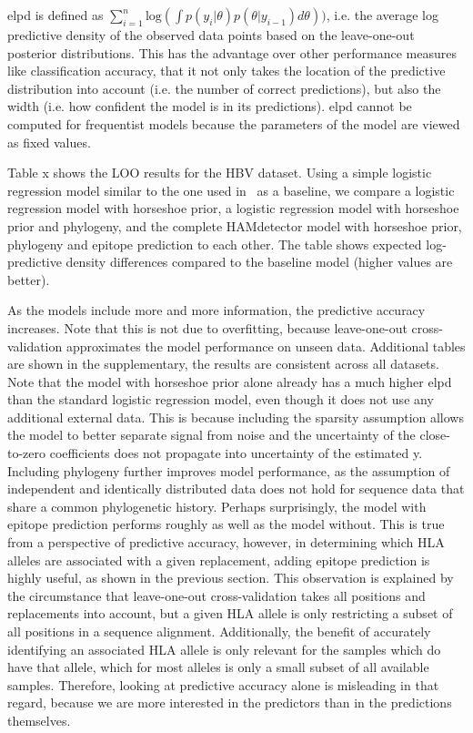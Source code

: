 \documentclass[fleqn,11pt]{SelfArx} %
\begin{document}
elpd is defined as \(\sum_{i=1}^{n}\text{log}(\int p(y_i|\theta)p(\theta|y_{i-1})d\theta))\), i.e. the average log predictive density of the observed data points based on the leave-one-out posterior distributions.
This has the advantage over other performance measures like classification accuracy, that it not only takes the location of the predictive distribution into account (i.e. the number of correct predictions), but also the width (i.e. how confident the model is in its predictions).
elpd cannot be computed for frequentist models because the parameters of the model are viewed as fixed values.

Table x shows the LOO results for the HBV dataset.
Using a simple logistic regression model similar to the one used in~\cite{Moore2002} as a baseline, we compare a logistic regression model with horseshoe prior, a logistic regression model with horseshoe prior and phylogeny, and the complete HAMdetector model with horseshoe prior, phylogeny and epitope prediction to each other.
The table shows expected log-predictive density differences compared to the baseline model (higher values are better).

As the models include more and more information, the predictive accuracy increases. Note that this is not due to overfitting, because leave-one-out cross-validation approximates the model performance on unseen data. Additional tables are shown in the supplementary, the results are consistent across all datasets.
Note that the model with horseshoe prior alone already has a much higher elpd than the standard logistic regression model, even though it does not use any additional external data. This is because including the sparsity assumption allows the model to better separate signal from noise and the uncertainty of the close-to-zero coefficients does not propagate into uncertainty of the estimated y.
Including phylogeny further improves model performance, as the assumption of independent and identically distributed data does not hold for sequence data that share a common phylogenetic history.
Perhaps surprisingly, the model with epitope prediction performs roughly as well as the model without. This is true from a perspective of predictive accuracy, however, in determining which HLA alleles are associated with a given replacement, adding epitope prediction is highly useful, as shown in the previous section. This observation is explained by the circumstance that leave-one-out cross-validation takes all positions and replacements into account, but a given HLA allele is only restricting a subset of all positions in a sequence alignment. Additionally, the benefit of accurately identifying an associated HLA allele is only relevant for the samples which do have that allele, which for most alleles is only a small subset of all available samples. Therefore, looking at predictive accuracy alone is misleading in that regard, because we are more interested in the predictors than in the predictions themselves.
\end{document}
